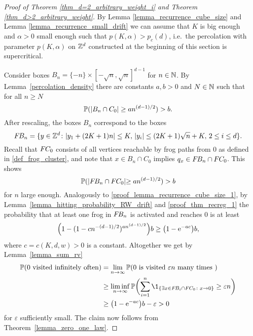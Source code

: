 \begin{proof}[Proof of Theorem \ref{thm_d=2_arbitrary_weight_i} and Theorem \ref{thm_d>2_arbitrary_weight}]
By Lemma \ref{lemma_recurrence_cube_size} and Lemma \ref{lemma_recurrence_small_drift} we can assume that $K$ is big enough and $\alpha >0$ small enough such that $p(K, \alpha)> p_c(d)$, i.e.~the percolation with parameter $p(K, \alpha)$ on $\Z^d$ constructed at the beginning of this section is supercritical. 

Consider boxes $B_n = \{-n\} \times [-\sqrt{n},\sqrt{n}]^{d-1}$ for $n \in \N$. By Lemma~\ref{percolation_density} there are constants $a,b > 0$ and $N \in \N$ such that for all $n \geq N$
\begin{equation*}
 \P(\lvert B_n \cap C_0\rvert \geq a n^{(d-1)/2})>b.
\end{equation*}
After rescaling, the boxes $B_n$ correspond to the boxes
\begin{equation*}
\fb_n = \{y \in \Z^d \colon \lvert y_1 + (2K+1)n \rvert \leq K,\, \lvert y_i \rvert \leq (2K+1)\sqrt{n} +K,\, 2 \leq i \leq d\}.
\end{equation*}
Recall that $\fc_0$ consists of all vertices reachable by frog paths from $0$ as defined in \eqref{def_frog_cluster}, and note that $x \in B_n \cap C_0$ implies $q_x \in  \fb_n \cap \fc_0$. 
This shows
\begin{equation}\label{proof_thm_recreg_1}
 \P(\lvert \fb_n \cap \fc_0 \lvert \geq a n^{(d-1)/2})>b
\end{equation}
for $n$ large enough. Analogously to \eqref{proof_lemma_recurrence_cube_size_1}, by Lemma~\ref{lemma_hitting_probability_RW_drift} and \eqref{proof_thm_recreg_1} the probability that at least one frog in $\fb_n$ is activated and reaches $0$ is at least
\begin{equation*}
 \Bigl(1-(1-cn^{-(d-1)/2})^{an^{(d-1)/2}}\Bigr)b \geq \bigl(1 - \e^{-ac}\bigr)b,
\end{equation*}
where $c=c(K,d,w)>0$ is a constant. Altogether we get by Lemma~\ref{lemma_sum_rv}
\begin{align*}
 \P(\text{$0$ visited infinitely often}) &=    \lim_{n \to \infty} \P(\text{$0$ is visited $\varepsilon n$ many times }) \\
                                         &\geq \liminf_{n \to \infty} \P\biggl( \sum_{i=1}^n \1_{\{\exists x \in \fb_i \cap \fc_{0} \colon x \to 0 \}} \geq \varepsilon n \biggr) \\
                                         &\geq \bigl(1 - \e^{-ac}\bigr)b - \varepsilon > 0
\end{align*}
for $\varepsilon$ sufficiently small. The claim now follows from Theorem~\ref{lemma_zero_one_law}. 
\end{proof}
















